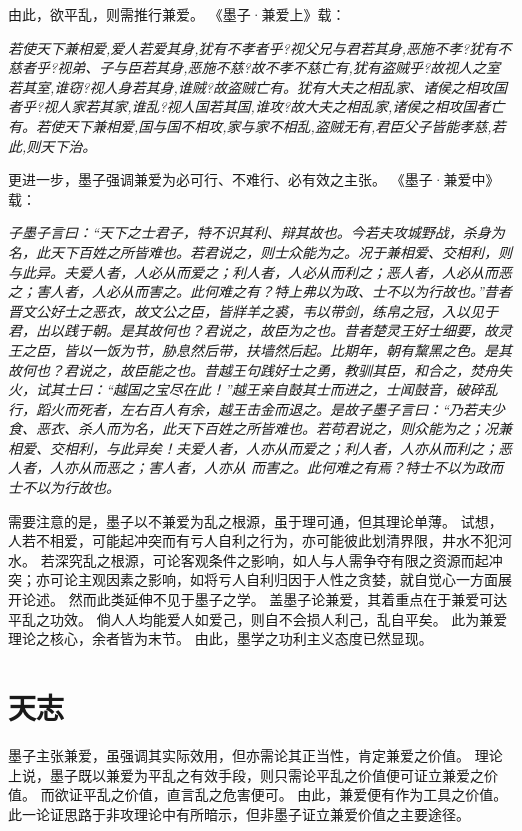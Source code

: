 \documentclass[11pt]{article}
\begin{document}
由此，欲平乱，则需推行兼爱。
《墨子·兼爱上》载：

\textit{若使天下兼相爱,爱人若爱其身,犹有不孝者乎?视父兄与君若其身,恶施不孝?犹有不慈者乎?视弟、子与臣若其身,恶施不慈?故不孝不慈亡有,犹有盗贼乎?故视人之室若其室,谁窃?视人身若其身,谁贼?故盗贼亡有。犹有大夫之相乱家、诸侯之相攻国者乎?视人家若其家,谁乱?视人国若其国,谁攻?故大夫之相乱家,诸侯之相攻国者亡有。若使天下兼相爱,国与国不相攻,家与家不相乱,盗贼无有,君臣父子皆能孝慈,若此,则天下治。}

更进一步，墨子强调兼爱为必可行、不难行、必有效之主张。
《墨子·兼爱中》载：

\textit{子墨子言曰：“天下之士君子，特不识其利、辩其故也。今若夫攻城野战，杀身为名，此天下百姓之所皆难也。若君说之，则士众能为之。况于兼相爱、交相利，则与此异。夫爱人者，人必从而爱之；利人者，人必从而利之；恶人者，人必从而恶之；害人者，人必从而害之。此何难之有？特上弗以为政、士不以为行故也。”昔者晋文公好士之恶衣，故文公之臣，皆牂羊之裘，韦以带剑，练帛之冠，入以见于君，出以践于朝。是其故何也？君说之，故臣为之也。昔者楚灵王好士细要，故灵王之臣，皆以一饭为节，胁息然后带，扶墙然后起。比期年，朝有黧黑之色。是其故何也？君说之，故臣能之也。昔越王句践好士之勇，教驯其臣，和合之，焚舟失火，试其士曰：“越国之宝尽在此！”越王亲自鼓其士而进之，士闻鼓音，破碎乱行，蹈火而死者，左右百人有余，越王击金而退之。是故子墨子言曰：“乃若夫少食、恶衣、杀人而为名，此天下百姓之所皆难也。若苟君说之，则众能为之；况兼相爱、交相利，与此异矣！夫爱人者，人亦从而爱之；利人者，人亦从而利之；恶人者，人亦从而恶之；害人者，人亦从 而害之。此何难之有焉？特士不以为政而士不以为行故也。}

\newline

需要注意的是，墨子以不兼爱为乱之根源，虽于理可通，但其理论单薄。
试想，人若不相爱，可能起冲突而有亏人自利之行为，亦可能彼此划清界限，井水不犯河水。
若深究乱之根源，可论客观条件之影响，如人与人需争夺有限之资源而起冲突；亦可论主观因素之影响，如将亏人自利归因于人性之贪婪，就自觉心一方面展开论述。
然而此类延伸不见于墨子之学。
盖墨子论兼爱，其着重点在于兼爱可达平乱之功效。
倘人人均能爱人如爱己，则自不会损人利己，乱自平矣。
此为兼爱理论之核心，余者皆为末节。
由此，墨学之功利主义态度已然显现。

\section{天志}
墨子主张兼爱，虽强调其实际效用，但亦需论其正当性，肯定兼爱之价值。
理论上说，墨子既以兼爱为平乱之有效手段，则只需论平乱之价值便可证立兼爱之价值。
而欲证平乱之价值，直言乱之危害便可。
由此，兼爱便有作为工具之价值。
此一论证思路于非攻理论中有所暗示，但非墨子证立兼爱价值之主要途径。
\end{document}
